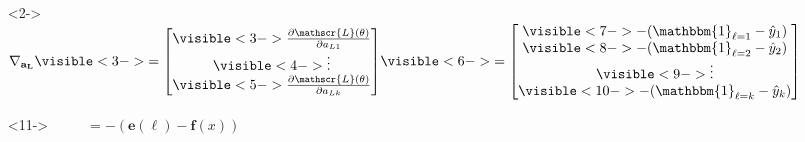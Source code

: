 \begin{frame}
\begin{columns}
\begin{overlayarea}{\textwidth}{\textheight}
      \vspace{0.42cm}
      \begin{itemize}
        \justifying
        \item[]<2-> $\mathbf{\nabla_{a_{L}}} \visible<3->{ =
                \begin{bmatrix}
                  \visible<3->{\frac{\partial \mathscr{L}(\theta)}{\partial a_{L1}}}   \\
                  \visible<4->{\vdots}                                              \\
                  \visible<5->{\frac{\partial \mathscr{L}(\theta)}{\partial a_{Lk}}} \\
                \end{bmatrix} }
              \visible<6->{ = \begin{bmatrix}
                  \visible<7->{ - (\mathbbm{1}_{\ell = 1} - \hat{y}_1)}       \\
                  \visible<8->{- (\mathbbm{1}_{\ell = 2} - \hat{y}_2)}        \\
                  \visible<9->{\vdots}                                     \\
                  \visible<10->{- (\mathbbm{1}_{\ell = k} - \hat{y}_{k})} \\
                \end{bmatrix} }$
        \item[]<11-> $\hspace{1cm}= - (\mathbf{e}(\ell) - \mathbf{f}(x))$
      \end{itemize}
    \end{overlayarea}
    \begin{overlayarea}{\textwidth}{\textheight}
      \makebox[\textwidth][c]{\usebox{\nnoutputtwocontent}}
    \end{overlayarea}
  \end{columns}
\end{frame}